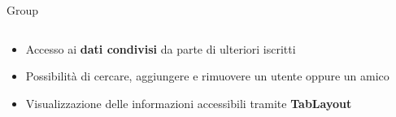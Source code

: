 \documentclass[10pt]{beamer}
\begin{document}
\begin{frame}{Group}
    \begin{columns}
        \begin{column}{0.5\textwidth}
            \hspace*{100pt}
            \begin{itemize}
                \item \small Accesso ai \textbf{dati condivisi} da parte di ulteriori iscritti
                \item \small Possibilità di cercare, aggiungere e rimuovere un utente oppure un amico
                \item \small Visualizzazione delle informazioni accessibili tramite \textbf{TabLayout}
            \end{itemize}
        \end{column}
        \begin{column}{0.5\textwidth}
            \begin{center}
            \end{center}
        \end{column}
    \end{columns}
\end{frame}
\end{document}
